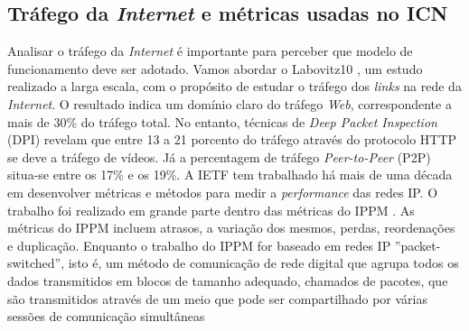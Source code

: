 \documentclass[conference]{IEEEtran}
\begin{document}
\subsection{Tr\'{a}fego da \textit{Internet} e m\'{e}tricas usadas no ICN}

Analisar o tr\'{a}fego da \textit{Internet} \'{e} importante para perceber que modelo de funcionamento deve ser adotado. Vamos abordar o Labovitz10 
, um estudo realizado a larga escala, com o prop\'{o}sito de estudar o tr\'{a}fego dos \textit{links} na rede da \textit{Internet}. O resultado indica um dom\'{i}nio claro do tr\'{a}fego \textit{Web}, correspondente a mais de 30\% do tr\'{a}fego total. No entanto, t\'{e}cnicas de \textit{Deep Packet Inspection} (DPI) revelam que entre 13 a 21 porcento do tr\'{a}fego atrav\'{e}s do protocolo HTTP se deve a tr\'{a}fego de v\'{i}deos. J\'{a} a percentagem de tr\'{a}fego \textit{Peer-to-Peer} (P2P) situa-se entre os 17\% e os 19\%.
A IETF 
 tem trabalhado h\'{a} mais de uma d\'{e}cada em desenvolver m\'{e}tricas e m\'{e}todos para medir a \textit{performance} das redes IP. O trabalho foi realizado em grande parte dentro das m\'{e}tricas do IPPM
. As m\'{e}tricas do IPPM incluem atrasos, a varia\c{c}\~{a}o dos mesmos, perdas, reordena\c{c}\~{o}es e duplica\c{c}\~{a}o. Enquanto o trabalho do IPPM for baseado em redes IP ''packet-switched'', isto \'{e}, um m\'{e}todo de comunica\c{c}\~{a}o de rede digital que agrupa todos os dados transmitidos em blocos de tamanho adequado, chamados de pacotes, que s\~{a}o transmitidos atrav\'{e}s de um meio que pode ser compartilhado por v\'{a}rias sess\~{o}es de comunica\c{c}\~{a}o simultâneas
\end{document}
